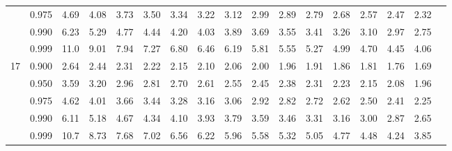 \documentclass[pdftex,11pt,openany]{book}\usepackage[]{graphicx}\usepackage[]{color}
\begin{document}
{\begin{center}
\begin{tabular}{rrr@{\,}r@{\,}r@{\,}r@{\,}r@{\,}r@{\,}r@{\,}r
                   @{\,}r@{\,}r@{\,}r@{\,}r@{\,}r@{\,}r@{\,}r}
  &0.975&4.69&4.08&3.73&3.50&3.34&3.22&3.12&2.99&2.89&2.79&2.68&2.57&2.47&2.32\\
  &0.990&6.23&5.29&4.77&4.44&4.20&4.03&3.89&3.69&3.55&3.41&3.26&3.10&2.97&2.75\\
  &0.999&11.0&9.01&7.94&7.27&6.80&6.46&6.19&5.81&5.55&5.27&4.99&4.70&4.45&4.06\\
17&0.900&2.64&2.44&2.31&2.22&2.15&2.10&2.06&2.00&1.96&1.91&1.86&1.81&1.76&1.69\\
  &0.950&3.59&3.20&2.96&2.81&2.70&2.61&2.55&2.45&2.38&2.31&2.23&2.15&2.08&1.96\\
  &0.975&4.62&4.01&3.66&3.44&3.28&3.16&3.06&2.92&2.82&2.72&2.62&2.50&2.41&2.25\\
  &0.990&6.11&5.18&4.67&4.34&4.10&3.93&3.79&3.59&3.46&3.31&3.16&3.00&2.87&2.65\\
  &0.999&10.7&8.73&7.68&7.02&6.56&6.22&5.96&5.58&5.32&5.05&4.77&4.48&4.24&3.85
\end{tabular}
\end{center}

\newpage



}
\end{document}
